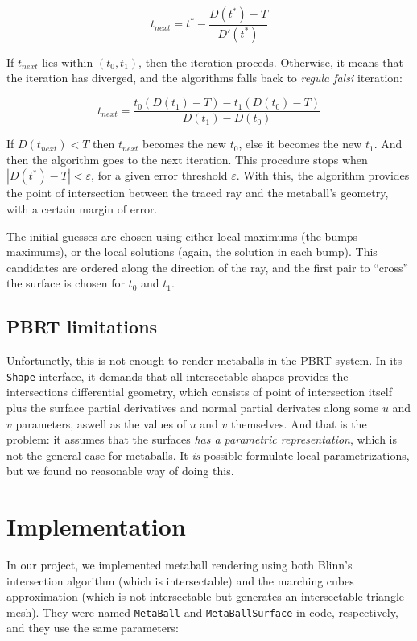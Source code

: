 \documentclass[conference]{acmsiggraph}
\begin{document}
\begin{equation}
  t_{next} = t^* - \frac{D(t^*) - T}{D'(t^*)}
\end{equation}

If $t_{next}$ lies within $(t_0, t_1)$, then the iteration proceds. Otherwise,
it means that the iteration has diverged, and the algorithms falls back to
\textit{regula falsi} iteration:

\begin{equation}
  t_{next} = \frac{t_0(D(t_1) - T) - t_1(D(t_0) - T)}{D(t_1) - D(t_0)}
\end{equation}

If $D(t_{next}) < T$ then $t_{next}$ becomes the new $t_0$, else it becomes the
new $t_1$. And then the algorithm goes to the next iteration. This procedure
stops when $|D(t^*) - T| < \varepsilon$, for a given error threshold $\varepsilon$.
With this, the algorithm provides the point of intersection between the traced ray
and the metaball's geometry, with a certain margin of error.

The initial guesses are chosen using either local maximums (the bumps maximums),
or the local solutions (again, the solution in each bump). This candidates are
ordered along the direction of the ray, and the first pair to ``cross'' the
surface is chosen for $t_0$ and $t_1$.

\subsection{PBRT limitations}

Unfortunetly, this is not enough to render metaballs in the PBRT system. In its
\texttt{Shape} interface, it demands that all intersectable shapes provides the
intersections differential geometry, which consists of point of intersection
itself plus the surface partial derivatives and normal partial derivates along
some $u$ and $v$ parameters, aswell as the values of $u$ and $v$ themselves. And
that is the problem: it assumes that the surfaces \textit{has a parametric
representation}, which is not the general case for metaballs. It \textit{is}
possible formulate local parametrizations, but we found no reasonable way of
doing this.

\section{Implementation}

In our project, we implemented metaball rendering using both Blinn's
intersection algorithm (which is intersectable) and the marching cubes
approximation (which is not intersectable but generates an intersectable 
triangle mesh). They were named \texttt{MetaBall} and \texttt{MetaBallSurface} 
in code, respectively, and they use the same parameters:
\end{document}
